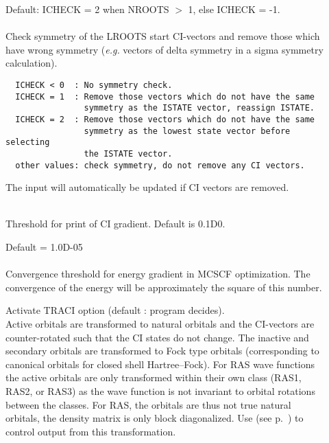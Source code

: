\begin{description}
\item[]
  Default: ICHECK = 2 when NROOTS $>$ 1, else ICHECK = -1.\\
   \\
  Check symmetry of the LROOTS start CI-vectors and remove those which
  have wrong symmetry ({\it e.g.\/} vectors of delta symmetry in a sigma
  symmetry calculation).
\begin{verbatim}
  ICHECK < 0  : No symmetry check.
  ICHECK = 1  : Remove those vectors which do not have the same
                symmetry as the ISTATE vector, reassign ISTATE.
  ICHECK = 2  : Remove those vectors which do not have the same
                symmetry as the lowest state vector before selecting
                the ISTATE vector.
  other values: check symmetry, do not remove any CI vectors.
\end{verbatim}
  The  input will automatically be
  updated if CI vectors are removed.

\item[]
   \\
  Threshold for print of CI gradient. Default is 0.1D0.

\item[]
  Default = 1.0D-05\\
   \\
  Convergence threshold for energy gradient in MCSCF optimization.
  The convergence of the energy will be approximately the square of this
  number.

\item[]
  Activate TRACI option (default : program decides).\\
  Active orbitals are transformed to natural orbitals and the CI-vectors
  are counter-rotated such that the CI states do not change.  The
  inactive and secondary orbitals are transformed to Fock type orbitals
  (corresponding to canonical orbitals for closed shell Hartree--Fock).
  For RAS wave functions the active orbitals are only transformed
  within their own class (RAS1, RAS2, or RAS3) as the wave function is
  not invariant to orbital rotations between the classes.  For RAS, the
  orbitals are thus not true natural orbitals, the density matrix is
  only block diagonalized.  Use  (see
  p.~\pageref{ref-priinp})   to control output from this
  transformation.

\end{description}


